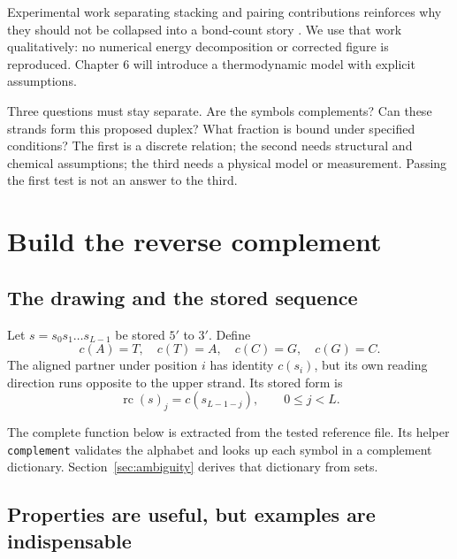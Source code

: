 Experimental work separating stacking and pairing contributions reinforces
why they should not be collapsed into a bond-count story
\cite{Yakovchuk2006}. We use that work qualitatively:
no numerical energy decomposition or corrected figure is reproduced.
Chapter 6 will introduce a thermodynamic model with explicit assumptions.

Three questions must stay separate. Are the symbols complements? Can these
strands form this proposed duplex? What fraction is bound under specified
conditions? The first is a discrete relation; the second needs structural
and chemical assumptions; the third needs a physical model or measurement.
Passing the first test is not an answer to the third.

\section{Build the reverse complement}

\subsection{The drawing and the stored sequence}

Let $s=s_0s_1\ldots s_{L-1}$ be stored $5'$ to $3'$. Define
\begin{equation}
c(A)=T,\quad c(T)=A,\quad c(C)=G,\quad c(G)=C.
\end{equation}
The aligned partner under position $i$ has identity $c(s_i)$, but its own
reading direction runs opposite to the upper strand. Its stored form is
\begin{equation}
\operatorname{rc}(s)_j=c(s_{L-1-j}),\qquad 0\leq j<L.
\label{eq:rc}
\end{equation}


The complete function below is extracted from the tested reference file.
Its helper \texttt{complement} validates the alphabet and looks up each
symbol in a complement dictionary. Section~\ref{sec:ambiguity} derives that
dictionary from sets.

\subsection{Properties are useful, but examples are indispensable}

